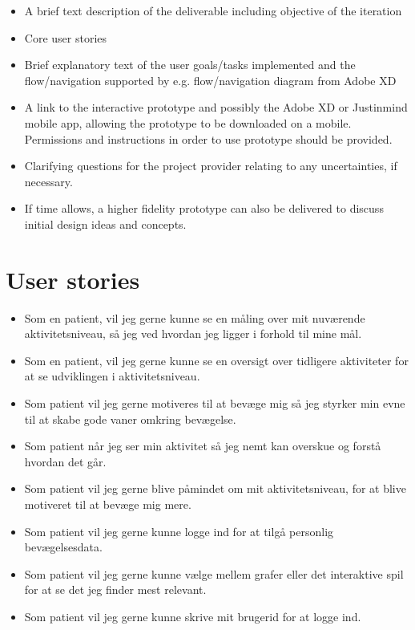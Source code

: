 \documentclass[10pt,a4paper]{article}
\begin{document}
\begin{itemize}

\item A brief text description of the deliverable including objective of the iteration
\item Core user stories
\item Brief explanatory text of the user goals/tasks implemented and the flow/navigation supported by e.g. flow/navigation diagram from Adobe XD
\item A link to the interactive prototype and possibly the Adobe XD or Justinmind mobile app, allowing the prototype to be downloaded on a mobile. Permissions and instructions in order to use prototype should be provided.
\item Clarifying questions for the project provider relating to any uncertainties, if necessary.
\item If time allows, a higher fidelity prototype can also be delivered to discuss initial design ideas and concepts.
\end{itemize}

\section{User stories}
\begin{itemize}
\item Som en patient, vil jeg gerne kunne se en måling over mit nuværende aktivitetsniveau, så jeg ved hvordan jeg ligger i forhold til mine mål.
\item Som en patient, vil jeg gerne kunne se en oversigt over tidligere aktiviteter for at se udviklingen i aktivitetsniveau.
\item Som patient vil jeg gerne motiveres til at bevæge mig så jeg styrker min evne til at skabe gode vaner omkring bevægelse. 
\item Som patient når jeg ser min aktivitet så jeg nemt kan overskue og forstå hvordan det går.
\item Som patient vil jeg gerne blive påmindet om mit aktivitetsniveau, for at blive motiveret til at bevæge mig mere.
\item Som patient vil jeg gerne kunne logge ind for at tilgå personlig bevægelsesdata.
\item Som patient vil jeg gerne kunne vælge mellem grafer eller det interaktive spil for at se det jeg finder mest relevant.
\item Som patient vil jeg gerne kunne skrive mit brugerid for at logge ind.
\end{itemize}
\end{document}
